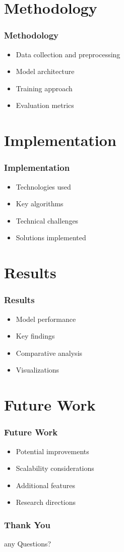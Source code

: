 \documentclass{beamer}
\begin{document}
\section{Methodology}
\begin{frame}
\frametitle{Methodology}
\begin{itemize}
    \item Data collection and preprocessing
    \item Model architecture
    \item Training approach
    \item Evaluation metrics
\end{itemize}
\end{frame}

\section{Implementation}
\begin{frame}
\frametitle{Implementation}
\begin{itemize}
    \item Technologies used
    \item Key algorithms
    \item Technical challenges
    \item Solutions implemented
\end{itemize}
\end{frame}

\section{Results}
\begin{frame}
\frametitle{Results}
\begin{itemize}
    \item Model performance
    \item Key findings
    \item Comparative analysis
    \item Visualizations
\end{itemize}
\end{frame}

\section{Future Work}
\begin{frame}
\frametitle{Future Work}
\begin{itemize}
    \item Potential improvements
    \item Scalability considerations
    \item Additional features
    \item Research directions
\end{itemize}
\end{frame}

\begin{frame}
\frametitle{Thank You}
\begin{center}
    any Questions?
\end{center}
\end{frame}
\end{document}
